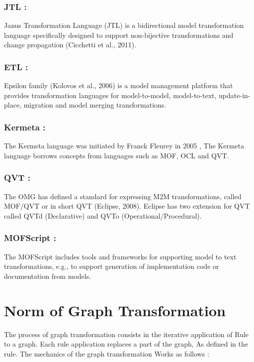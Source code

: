 \subsubsection{JTL : }
Janus Transformation Language (JTL) is a bidirectional model transformation language specifically designed to support non-bijective transformations and change propagation (Cicchetti et al., 2011)\cite{ch3lang}.

\subsubsection{ETL : }
Epsilon family (Kolovos et al., 2006) is a model management platform that provides transformation languages for model-to-model, model-to-text, update-in-place, migration and model merging transformations\cite{ch3lang}.

\subsubsection{Kermeta : }  
The Kermeta language was initiated by Franck Fleurey in 2005 , The Kermeta language borrows concepts from languages such as MOF, OCL and QVT\cite{ch3lang}.

\subsubsection{QVT : } 
The OMG has defined a standard for expressing M2M transformations, called MOF/QVT or in short QVT (Eclipse, 2008). Eclipse has two extension for QVT called QVTd (Declarative) and QVTo (Operational/Procedural)\cite{ch3lang}.

\subsubsection{MOFScript : } 
The MOFScript includes tools and frameworks for supporting model to text transformations, e.g., to support generation of implementation code or documentation from models\cite{ch3lang}.




\section{Norm of Graph Transformation} 
The process of graph transformation consists in the iterative application of
Rule to a graph. Each rule application replaces a part of the graph, As defined in the rule. 
The mechanics of the graph transformation Works as follows : 

